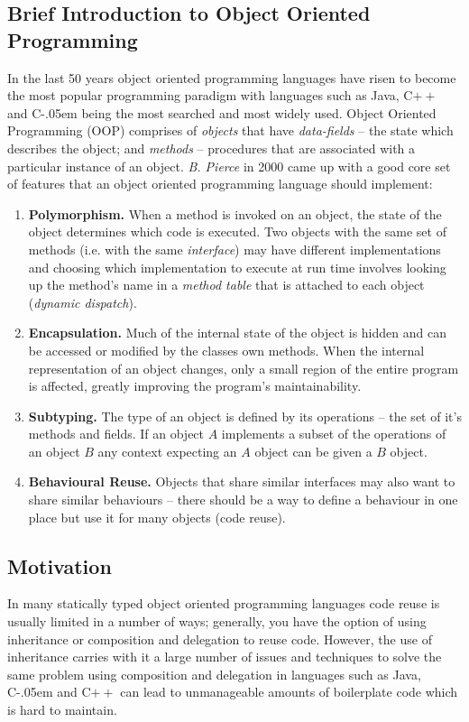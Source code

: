 \documentclass{article}
\newcommand{\sharponend}[1]{{\settoheight{\dimen0}{#1}#1\kern-.05em \resizebox{!}{\dimen0}{\raisebox{\depth}{\fontseries{b}\selectfont\#}}}}
\newcommand{\csharp}{\sharponend{C}\xspace}
\newcommand*{\cpp}{C\ensuremath{++}\xspace}
\begin{document}
\subsection{Brief Introduction to Object Oriented Programming}
\label{sec:OOPIntro}
In the last 50 years object oriented programming languages have risen to become the most popular programming paradigm with languages such as Java, \cpp and \csharp being the most searched and most widely used\cite{TIOBE}. Object Oriented Programming (OOP) comprises of \textit{objects} that have \textit{data-fields} -- the state which describes the object; and \textit{methods} -- procedures that are associated with a particular instance of an object. \textit{B. Pierce} in 2000 came up with a good core set of features that an object oriented programming language should implement\cite[p.~225-227]{PIERCE:2002}:
\begin{enumerate}
	\item{\textbf{Polymorphism.} When a method is invoked on an object, the state of the object determines which code is executed. Two objects with the same set of methods (i.e. with the same \textit{interface}) may have different implementations and choosing which implementation to execute at run time involves looking up the method's name in a \textit{method table} that is attached to each object (\textit{dynamic dispatch}).}
	\item{\textbf{Encapsulation.} Much of the internal state of the object is hidden and can be accessed or modified by the classes own methods. When the internal representation of an object changes, only a small region of the entire program is affected, greatly improving the program's maintainability.} 
	\item{\textbf{Subtyping.} The type of an object is defined by its operations -- the set of it's methods and fields. If an object $A$ implements a subset of the operations of an object $B$ any context expecting an $A$ object can be given a $B$ object.}
	\item{\textbf{Behavioural Reuse.} Objects that share similar interfaces may also want to share similar behaviours -- there should be a way to define a behaviour in one place but use it for many objects (code reuse).}
\end{enumerate}

\subsection{Motivation}
In many statically typed object oriented programming languages code reuse is usually limited in a number of ways; generally, you have the option of using inheritance or composition and delegation to reuse code. However, the use of inheritance carries with it a large number of issues and techniques to solve the same problem using composition and delegation in languages such as Java, \csharp and \cpp can lead to unmanageable amounts of boilerplate code which is hard to maintain.
\end{document}
